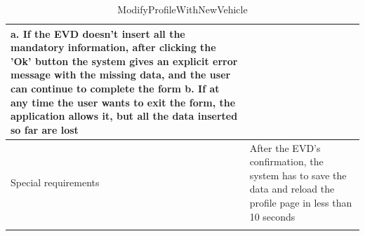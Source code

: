 \begin{center}
\begin{longtable}{p{4cm} p{11cm}}
        a. If the EVD doesn't insert all the mandatory information, after clicking the 'Ok' button the system gives an explicit error message with the missing data, and the user can continue to complete the form \newline
        b. If at any time the user wants to exit the form, the application allows it, but all the data inserted so far are lost \\
     \hline
     Special requirements & After the EVD's confirmation, the system has to save the data and reload the profile page in less than 10 seconds \\
     \hline
    \caption{ModifyProfileWithNewVehicle}
    \label{tab:ModifyProfileWithNewVehicle}
    \end{longtable}
\end{center}

